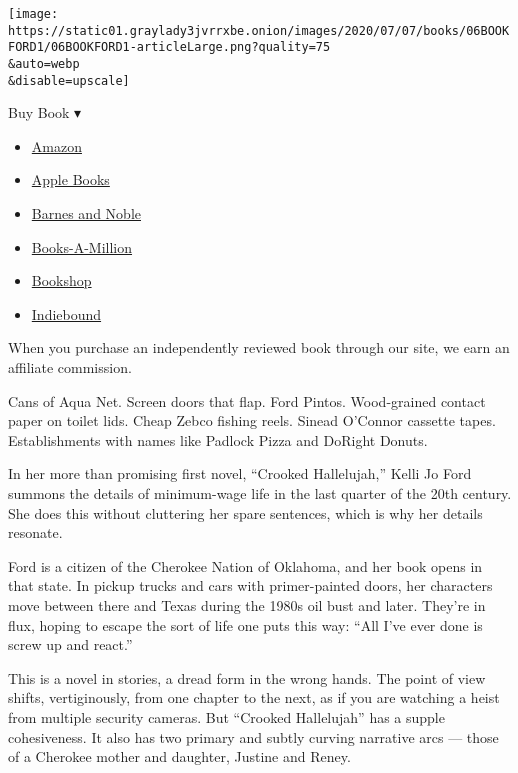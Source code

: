 \texttt{[image: https://static01.graylady3jvrrxbe.onion/images/2020/07/07/books/06BOOKFORD1/06BOOKFORD1-articleLarge.png?quality=75\\\&auto=webp\\\&disable=upscale]}

Buy Book ▾

\begin{itemize}
\tightlist
\item
  \href{https://www.amazon.com/gp/search?index=books\&tag=NYTBSREV-20\&field-keywords=Crooked+Hallelujah+Kelli+Jo+Ford}{Amazon}
\item
  \href{https://du-gae-books-dot-nyt-du-prd.appspot.com/buy?title=Crooked+Hallelujah\&author=Kelli+Jo+Ford}{Apple
  Books}
\item
  \href{https://www.anrdoezrs.net/click-7990613-11819508?url=https\%3A\%2F\%2Fwww.barnesandnoble.com\%2Fw\%2F\%3Fean\%3D9780802149121}{Barnes
  and Noble}
\item
  \href{https://www.anrdoezrs.net/click-7990613-35140?url=https\%3A\%2F\%2Fwww.booksamillion.com\%2Fp\%2FCrooked\%2BHallelujah\%2FKelli\%2BJo\%2BFord\%2F9780802149121}{Books-A-Million}
\item
  \href{https://bookshop.org/a/3546/9780802149121}{Bookshop}
\item
  \href{https://www.indiebound.org/book/9780802149121?aff=NYT}{Indiebound}
\end{itemize}

When you purchase an independently reviewed book through our site, we
earn an affiliate commission.

Cans of Aqua Net. Screen doors that flap. Ford Pintos. Wood-grained
contact paper on toilet lids. Cheap Zebco fishing reels. Sinead O'Connor
cassette tapes. Establishments with names like Padlock Pizza and DoRight
Donuts.

In her more than promising first novel, ``Crooked Hallelujah,'' Kelli Jo
Ford summons the details of minimum-wage life in the last quarter of the
20th century. She does this without cluttering her spare sentences,
which is why her details resonate.

Ford is a citizen of the Cherokee Nation of Oklahoma, and her book opens
in that state. In pickup trucks and cars with primer-painted doors, her
characters move between there and Texas during the 1980s oil bust and
later. They're in flux, hoping to escape the sort of life one puts this
way: ``All I've ever done is screw up and react.''

This is a novel in stories, a dread form in the wrong hands. The point
of view shifts, vertiginously, from one chapter to the next, as if you
are watching a heist from multiple security cameras. But ``Crooked
Hallelujah'' has a supple cohesiveness. It also has two primary and
subtly curving narrative arcs --- those of a Cherokee mother and
daughter, Justine and Reney.

